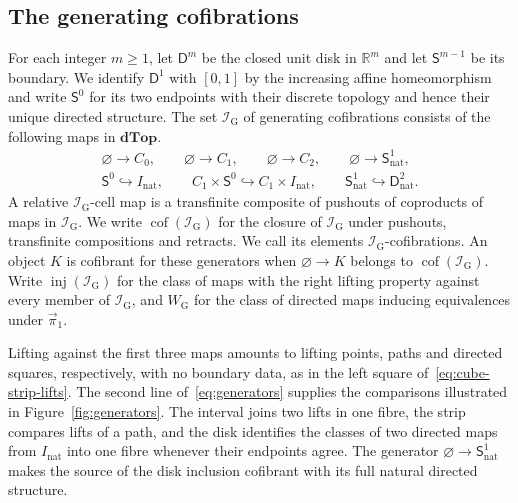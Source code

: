\documentclass[12pt,a4paper]{amsart}
\theoremstyle{definition}
\renewcommand{\geq}{\geqslant}
\renewcommand{\vec}{\overrightarrow}
\newcommand{\D}{\mathbf{dTop}}
\newcommand{\I}{\mathcal I_{\mathrm G}}
\newcommand{\WG}{W_{\mathrm G}}
\newcommand{\rev}[1]{#1_{\mathrm{nat}}}
\newcommand{\Iv}{\rev{I}}
\newcommand{\cube}[1]{C_{#1}}
\newcommand{\PiC}{\vec{\pi}_1}
\begin{document}
\subsection*{The generating cofibrations}
For each integer $m\geq1$, let $\mathsf{D}^m$ be the closed unit disk in $\mathbb R^m$ and let $\mathsf{S}^{m-1}$ be its boundary. We identify $\mathsf{D}^1$ with $[0,1]$ by the increasing affine homeomorphism and write $\mathsf{S}^0$ for its two endpoints with their discrete topology and hence their unique directed structure. The set $\I$ of generating cofibrations consists of the following maps in $\D$.
\begin{equation}\label{eq:generators}
\begin{gathered}
 \varnothing\longrightarrow\cube 0,\qquad
 \varnothing\longrightarrow\cube 1,\qquad
 \varnothing\longrightarrow\cube 2,\qquad
 \varnothing\longrightarrow\rev{\mathsf{S}^1},\\[2pt]
 \mathsf{S}^0\hookrightarrow\Iv,\qquad
 \cube 1\times \mathsf{S}^0\hookrightarrow\cube 1\times\Iv,\qquad
 \rev{\mathsf{S}^1}\hookrightarrow\rev{\mathsf{D}^2}.
\end{gathered}
\end{equation}
A relative $\I$-cell map is a transfinite composite of pushouts of coproducts of maps in $\I$. We write $\operatorname{cof}(\I)$ for the closure of $\I$ under pushouts, transfinite compositions and retracts. We call its elements $\I$-cofibrations. An object $K$ is cofibrant for these generators when $\varnothing\to K$ belongs to $\operatorname{cof}(\I)$. Write $\operatorname{inj}(\I)$ for the class of maps with the right lifting property against every member of $\I$, and $\WG$ for the class of directed maps inducing equivalences under $\PiC$.

Lifting against the first three maps amounts to lifting points, paths and directed squares, respectively, with no boundary data, as in the left square of~\eqref{eq:cube-strip-lifts}. The second line of~\eqref{eq:generators} supplies the comparisons illustrated in Figure~\ref{fig:generators}. The interval joins two lifts in one fibre, the strip compares lifts of a path, and the disk identifies the classes of two directed maps from $\Iv$ into one fibre whenever their endpoints agree. The generator $\varnothing\to\rev{\mathsf{S}^1}$ makes the source of the disk inclusion cofibrant with its full natural directed structure.
\end{document}
